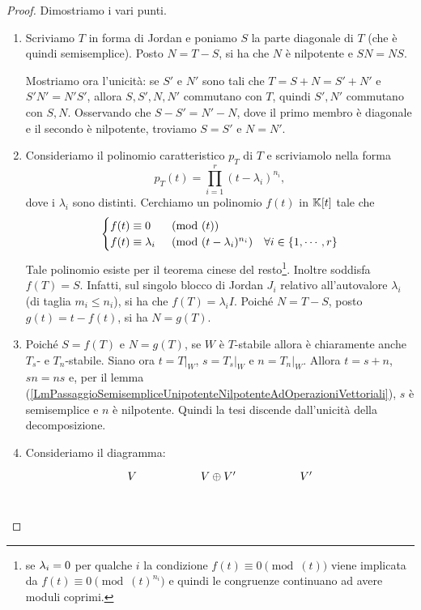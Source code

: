 \begin{proof}
Dimostriamo i vari punti. 
\setlength{\leftmargini}{0cm}
\begin{enumerate}
    \item Scriviamo $T$ in forma di Jordan e poniamo $S$ la parte diagonale di $T$ (che è quindi semisemplice). Posto $N=T-S$, si ha che $N$ è nilpotente e $SN=NS$.
    
    Mostriamo ora l'unicità: se $S'$ e $N'$ sono tali che $T=S+N=S'+N'$ e $S'N'=N'S'$, allora $S,S',N,N'$ commutano con $T$, quindi $S',N'$ commutano con $S,N$. Osservando che $S-S'=N'-N$, dove il primo membro è diagonale e il secondo è nilpotente, troviamo $S=S'$ e $N=N'$. 
    \item Consideriamo il polinomio caratteristico $p_T$ di $T$ e scriviamolo nella forma \[p_T(t)=\prod_{i=1}^r(t-\lambda_i)^{n_i},\] dove i $\lambda_i$ sono distinti. Cerchiamo un polinomio $f(t)$ in $\mathbb{K}[t]$ tale che 
    \[\begin{cases}
    f(t)\equiv 0 &\pmod{(t)}\\
    f(t)\equiv \lambda_i &\pmod{(t-\lambda_i)^{n_i}} \quad \forall i\in\left\{ 1,\cdots, r\right\}
    \end{cases}\]
    Tale polinomio esiste per il teorema cinese del resto\footnote{se $\lambda_i=0$ per qualche $i$ la condizione $f(t)\equiv 0 \pmod{(t)}$ viene implicata da $f(t)\equiv 0 \pmod{(t)^{n_i}}$ e quindi le congruenze continuano ad avere moduli coprimi.}. Inoltre soddisfa $f(T)=S$. Infatti, sul singolo blocco di Jordan $J_i$ relativo all'autovalore $\lambda_i$ (di taglia $m_i\le n_i$), si ha che $f(T)=\lambda_i I$. Poiché $N=T-S$, posto $g(t)=t-f(t)$, si ha $N=g(T)$. 
    \item Poiché $S=f(T)$ e $N=g(T)$, se $W$ è $T$-stabile allora \`e chiaramente anche $T_s$- e $T_n$-stabile. Siano ora $t=\left.T\right|_{W}$, $s=\left.T_s\right|_{W}$ e $n=\left.T_n\right|_{W}$. Allora $t=s+n$, $sn=ns$ e, per il lemma (\ref{LmPassaggioSemisempliceUnipotenteNilpotenteAdOperazioniVettoriali}), $s$ è semisemplice e $n$ è nilpotente. Quindi la tesi discende dall'unicità della decomposizione.
    \item Consideriamo il diagramma:
\[\begin{tikzcd}
	V && {V\oplus V'} && {V'} \\

\end{tikzcd}\]
\end{enumerate}
\end{proof}
